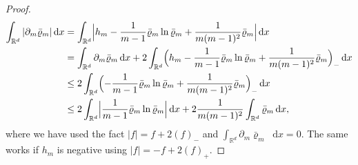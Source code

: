 \documentclass[JEP,XML,SOM,Unicode,published]{cedram}
\newcommand{\dx}[1]{\mathop{}\!\mathrm{d} #1}
\newcommand{\R}{\mathbb{R}}
\theoremstyle{plain}
\theoremstyle{remark}
\begin{document}
\begin{proof}
\begin{equation}\label{dmrho}
\begin{split} \int_{\R^d} |\partial_m \bar\varrho_m| \dx x &= \int_{\R^d} \Bigl |h_m - \frac{1}{m-1}\bar\varrho_m \ln \bar\varrho_m + \frac{1}{m(m-1)^2}\bar\varrho_m \Bigr| \dx x\\
&= \int_{\R^d}\partial_m \bar\varrho_m \dx x + 2\int_{\R^d} \Bigl(h_m - \frac{1}{m-1}\bar\varrho_m \ln \bar\varrho_m + \frac{1}{m(m-1)^2}\bar\varrho_m \Bigr)_- \dx x \\
&\leq 2 \int_{\R^d} \Bigl(- \frac{1}{m-1}\bar\varrho_m \ln \bar\varrho_m + \frac{1}{m(m-1)^2}\bar\varrho_m \Bigr)_- \dx x \\
&\leq 2 \int_{\R^d} \Bigl|\frac{1}{m-1}\bar\varrho_m \ln \bar\varrho_m \Bigr| \dx x + 2 \frac{1}{m(m-1)^2}\int_{\R^d}\bar\varrho_m \dx x,
\end{split}
\end{equation}
where we have used the fact $|f| = f + 2 (f)_-$ and $\int_{\R^d}\partial_m \bar\varrho_m \dx x=0$. The same works if $h_m$ is negative using $|f|=-f +2 (f)_+$.


\end{proof}
\end{document}
